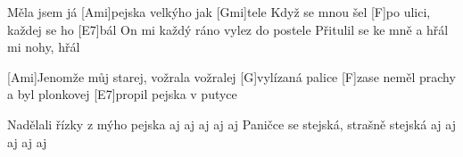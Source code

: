 
Měla jsem já [Ami]pejska velkýho jak [Gmi]tele
Když se mnou šel [F]po ulici, každej se ho [E7]bál
On mi každý ráno vylez do postele
Přitulil se ke mně a hřál mi nohy, hřál

[Ami]Jenomže můj starej, vožrala vožralej
[G]vylízaná palice
[F]zase neměl prachy a byl plonkovej
[E7]propil pejska v putyce

Nadělali řízky z mýho pejska 
aj aj aj aj aj 
Paničce se stejská, strašně stejská 
aj aj aj aj aj 
